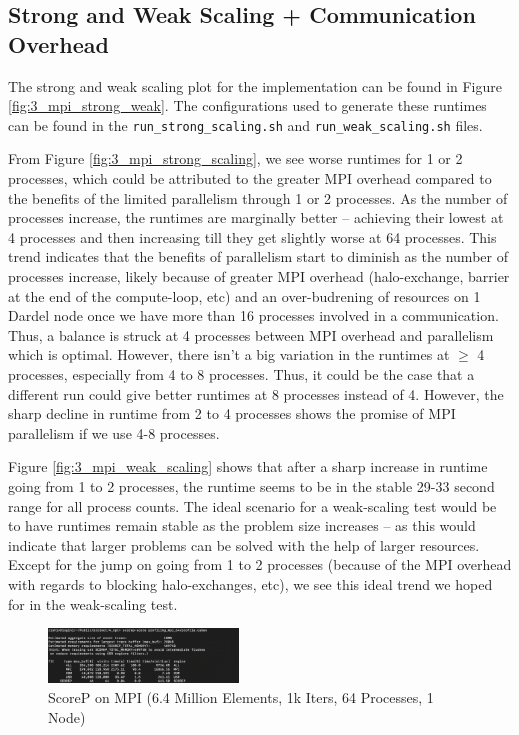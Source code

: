 \documentclass[a4paper,10pt]{article}
\begin{document}
\begin{multicols}{2}
\subsection{Strong and Weak Scaling + Communication Overhead}
\label{sec:3_mpi_analysis}

The strong and weak scaling plot for the implementation can be found in Figure \ref{fig:3_mpi_strong_weak}. The configurations used to generate these runtimes can be found in the \verb|run_strong_scaling.sh| and \verb|run_weak_scaling.sh| files.

From Figure \ref{fig:3_mpi_strong_scaling}, we see worse runtimes for 1 or 2 processes, which could be attributed to the greater MPI overhead compared to the benefits of the limited parallelism through 1 or 2 processes. As the number of processes increase, the runtimes are marginally better -- achieving their lowest at 4 processes and then increasing till they get slightly worse at 64 processes. This trend indicates that the benefits of parallelism start to diminish as the number of processes increase, likely because of greater MPI overhead (halo-exchange, barrier at the end of the compute-loop, etc) and an over-budrening of resources on 1 Dardel node once we have more than 16 processes involved in a communication. Thus, a balance is struck at 4 processes between MPI overhead and parallelism which is optimal. However, there isn't a big variation in the runtimes at $\geq$ 4 processes, especially from 4 to 8 processes. Thus, it could be the case that a different run could give better runtimes at 8 processes instead of 4. However, the sharp decline in runtime from 2 to 4 processes shows the promise of MPI parallelism if we use 4-8 processes. 

Figure \ref{fig:3_mpi_weak_scaling} shows that after a sharp increase in runtime going from 1 to 2 processes, the runtime seems to be in the stable 29-33 second range for all process counts. The ideal scenario for a weak-scaling test would be to have runtimes remain stable as the problem size increases -- as this would indicate that larger problems can be solved with the help of larger resources. Except for the jump on going from 1 to 2 processes (because of the MPI overhead with regards to blocking halo-exchanges, etc), we see this ideal trend we hoped for in the weak-scaling test. 

\begin{figure}[H]
  \centering
  \includegraphics[width=0.45\textwidth]{../images/4_opt/scorep_64_mpi.png}
  \caption{ScoreP on MPI (6.4 Million Elements, 1k Iters, 64 Processes, 1 Node)}
  \label{fig:3_mpi_scorep_64}
\end{figure}


\end{multicols}
\end{document}
